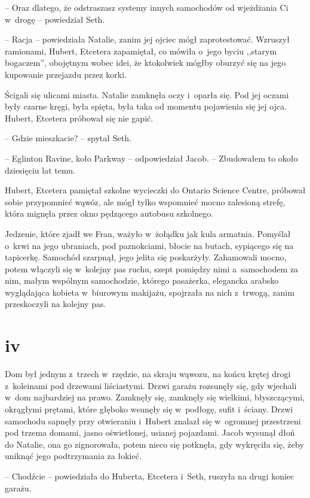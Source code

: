 \documentclass[oneside,polish,11pt,sfheadings]{mwbk}
\begin{document}
-- Oraz dlatego, że odstraszasz systemy innych samochodów od wjeżdżania
Ci w~drogę -- powiedział Seth.

-- Racja -- powiedziała Natalie, zanim jej ojciec mógł zaprotestować.
Wzruszył ramionami, Hubert, Etcetera zapamiętał, co mówiła o~jego byciu
,,starym bogaczem'', obojętnym wobec idei, że ktokolwiek mógłby oburzyć
się na jego kupowanie przejazdu przez korki.

Ścigali się ulicami miasta. Natalie zamknęła oczy i~oparła się. Pod jej
oczami były czarne kręgi, była spięta, była taka od momentu pojawienia
się jej ojca. Hubert, Etcetera próbował się nie gapić.

-- Gdzie mieszkacie? -- spytał Seth.

-- Eglinton Ravine, koło Parkway -- odpowiedział Jacob. -- Zbudowałem to
około dziesięciu lat temu.

Hubert, Etcetera pamiętał szkolne wycieczki do Ontario Science Centre,
próbował sobie przypomnieć wąwóz, ale mógł tylko wspomnieć mocno
zalesioną strefę, która mignęła przez okno pędzącego autobusu szkolnego.

Jedzenie, które zjadł we Fran, ważyło w~żołądku jak kula armatnia.
Pomyślał o~krwi na jego ubraniach, pod paznokciami, błocie na butach,
sypiącego się na tapicerkę. Samochód szarpnął, jego jelita się
poskarżyły. Zahamowali mocno, potem włączyli się w~kolejny pas ruchu,
szept pomiędzy nimi a~samochodem za nim, małym wspólnym samochodzie,
którego pasażerka, elegancka arabsko \dywiz wyglądająca kobieta w~biurowym
makijażu, spojrzała na nich z~trwogą, zanim przeskoczyli na kolejny pas.

\chapter*{iv}

Dom był jednym z~trzech w~rzędzie, na skraju wąwozu, na końcu krętej
drogi z~koleinami pod drzewami liściastymi. Drzwi garażu rozsunęły się,
gdy wjechali w~dom najbardziej na prawo. Zamknęły się, zamknęły się
wielkimi, błyszczącymi, okrągłymi prętami, które głęboko wsunęły się w~podłogę, sufit i~ściany. Drzwi samochodu sapnęły przy otwieraniu i~Hubert znalazł się w~ogromnej przestrzeni pod trzema domami, jasno
oświetlonej, usianej pojazdami. Jacob wysunął dłoń do Natalie, ona go
zignorowała, potem nieco się potknęła, gdy wykręciła się, żeby uniknąć
jego podtrzymania za łokieć.

-- Chodźcie -- powiedziała do Huberta, Etcetera i~Seth, ruszyła na drugi
koniec garażu.
\end{document}
